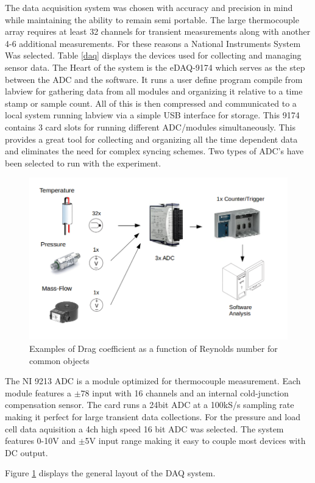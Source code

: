 \documentclass[paper=a4, fontsize=11pt, abstract=on]{scrartcl}
\numberwithin{equation}{section}		%
\numberwithin{figure}{section}			%
\numberwithin{table}{section}				%
\begin{document}
The data acquisition system was chosen with accuracy and precision in mind while maintaining the ability to remain semi portable. The large thermocouple array requires at least 32 channels for transient measurements along with another 4-6 additional measurements. For these reasons a National Instruments System Was selected. Table \ref{daq} displays the devices used for collecting and managing sensor data. The Heart of the system is the eDAQ-9174 which serves as the step between the ADC and the software. It runs a user define program compile from labview for gathering data from all modules and organizing it relative to a time stamp or sample count. All of this is then compressed and communicated to a local system running labview via a simple USB interface for storage. This 9174 contains 3 card slots for running different ADC/modules simultaneously. This provides a great tool for collecting and organizing all the time dependent data and eliminates the need for complex syncing schemes. Two types of ADC's have been selected to run with the experiment. 


\begin{figure}[H]
\centering
\includegraphics[width=0.8\linewidth]{sch}
\caption{Examples of Drag coefficient as a function of Reynolds number for common objects}
\label{daqd}
\end{figure}


The NI 9213 ADC is a module optimized for thermocouple measurement. Each module features a $\pm78$ input with 16 channels and an internal cold-junction compensation sensor. The card runs a 24bit ADC at a 100kS/s sampling rate making it perfect for large transient data collections. For the pressure and load cell data aquisition a 4ch high speed 16 bit ADC was selected. The system features 0-10V and $\pm$5V input range making it easy to couple most devices with DC output. 


Figure \ref{daqd} displays the general layout of the DAQ system.
\end{document}

